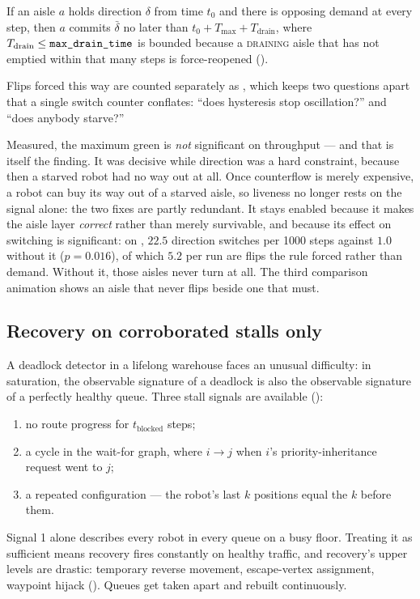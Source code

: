 \begin{proposition}
\label{prop:maxgreen}
If an aisle $a$ holds direction $\delta$ from time $t_0$ and there is opposing
demand at every step, then $a$ commits $\bar{\delta}$ no later than
$t_0 + T_{\max} + T_{\mathrm{drain}}$, where $T_{\mathrm{drain}} \leq
\texttt{max\_drain\_time}$ is bounded because a \textsc{draining} aisle that has
not emptied within that many steps is force-reopened
().
\end{proposition}

Flips forced this way are counted separately as ,
which keeps two questions apart that a single switch counter conflates: ``does
hysteresis stop oscillation?'' and ``does anybody starve?''

Measured, the maximum green is \emph{not} significant on throughput --- and
that is itself the finding. It was decisive while direction was a hard
constraint, because then a starved robot had no way out at all. Once
counterflow is merely expensive, a robot can buy its way out of a starved
aisle, so liveness no longer rests on the signal alone: the two fixes are
partly redundant. It stays enabled because it makes the aisle layer
\emph{correct} rather than merely survivable, and because its effect on
switching is significant: on , $22.5$ direction
switches per 1000 steps against $1.0$ without it ($p = 0.016$), of which $5.2$
per run are flips the rule forced rather than demand. Without it, those aisles
never turn at all. The third comparison animation shows
an aisle that never flips beside one that must.

\subsection{Recovery on corroborated stalls only}
\label{sec:contribution-corroboration}

A deadlock detector in a lifelong warehouse faces an unusual difficulty: in
saturation, the observable signature of a deadlock is also the observable
signature of a perfectly healthy queue. Three stall signals are available
():
\begin{enumerate}
\item no route progress for $t_{\mathrm{blocked}}$ steps;
\item a cycle in the wait-for graph, where $i \to j$ when $i$'s
  priority-inheritance request went to $j$;
\item a repeated configuration --- the robot's last $k$ positions equal the $k$
  before them.
\end{enumerate}
Signal 1 alone describes every robot in every queue on a busy floor. Treating
it as sufficient means recovery fires constantly on healthy traffic, and
recovery's upper levels are drastic: temporary reverse movement, escape-vertex
assignment, waypoint hijack (). Queues get taken
apart and rebuilt continuously.


